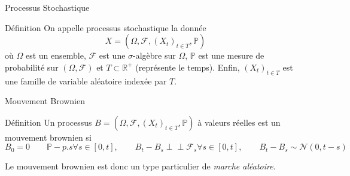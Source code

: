 \documentclass{beamer}
\newcommand{\1}{\mathmybb{1}}
\newcommand{\indep}{\perp \!\!\! \perp}
\begin{document}
\begin{frame}{Processus Stochastique}
  \begin{block}{Définition}
    On appelle processus stochastique la donnée
    \begin{equation}
      X = (\varOmega, \mathcal{F}, \left(  X_{t} \right)_{t\in T}, \mathbb{P})
    \end{equation}
    où $ \varOmega $ est un ensemble, $ \mathcal{F} $ est une $\sigma$-algèbre sur $ \varOmega $, $\mathbb{P}$ est une mesure de probabilité sur $ \left( \varOmega , \mathcal{F} \right)$ et $T \subset \mathbb{R}^{+}$ (représente le temps).
    Enfin, $\left( X_{t} \right)_{t\in T} $  est une famille de variable aléatoire indexée par $ T $.
  \end{block}
\end{frame}
\begin{frame}{Mouvement Brownien}
  \begin{block}{Définition}
    Un processus $ B = (\varOmega, \mathcal{F}, \left(  X_{t} \right)_{t\in T}, \mathbb{P} ) $ à valeurs réelles est un mouvement brownien si
    \begin{subequations}
      \begin{equation} B_{0} = 0 \qquad \mathbb{P}-p.s \end{equation}
      \begin{equation} \forall s \in \left[0, t\right], \qquad B_{t} - B_{s} \indep \mathcal{F}_{s} \end{equation}
      \begin{equation} \forall s \in \left[0, t\right], \qquad B_{t} - B_{s} \sim \mathcal{N} \left( 0, t-s\right)\end{equation}
      \end{subequations}
    \end{block}
    Le mouvement brownien est donc un type particulier de {\em marche aléatoire}.
\end{frame}
\end{document}
